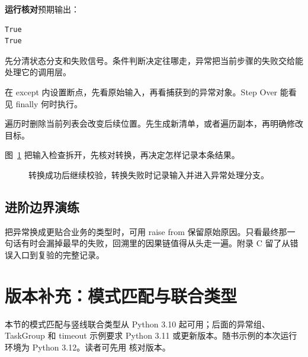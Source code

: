 \documentclass[UTF8,a4paper,oneside,openany,fontset=none,11pt]{ctexbook}
\newcommand{\code}[1]{\texttt{\detokenize{#1}}}
\begin{document}
\textbf{运行核对}\enspace 预期输出：
\begin{lstlisting}[language={},numbers=none]
True
True
\end{lstlisting}

\par

\begin{myunderstanding}
先分清状态分支和失败信号。条件判断决定往哪走，异常把当前步骤的失败交给能处理它的调用层。
\end{myunderstanding}

\begin{pycharmpractice}
在 except 内设置断点，先看原始输入，再看捕获到的异常对象。Step Over 能看见 finally 何时执行。
\end{pycharmpractice}

\begin{pitfall}
遍历时删除当前列表会改变后续位置。先生成新清单，或者遍历副本，再明确修改目标。
\end{pitfall}
图~\ref{fig:chapter-3-flow} 把输入检查拆开，先核对转换，再决定怎样记录本条结果。
\begin{figure}[htbp]
  \centering
  \caption{转换成功后继续校验，转换失败时记录输入并进入异常处理分支。}
  \label{fig:chapter-3-flow}
\end{figure}

\subsection*{进阶边界演练}
把异常换成更贴合业务的类型时，可用 raise from 保留原始原因。只看最终那一句话有时会漏掉最早的失败，回溯里的因果链值得从头走一遍。附录 C 留了从错误入口到复验的完整记录。

\section{版本补充：模式匹配与联合类型}\label{rev:python:language}
本节的模式匹配与竖线联合类型从 Python 3.10 起可用；后面的异常组、TaskGroup 和 timeout 示例要求 Python 3.11 或更新版本。随书示例的本次运行环境为 Python 3.12。读者可先用 \code{python --version} 核对版本。
\end{document}

